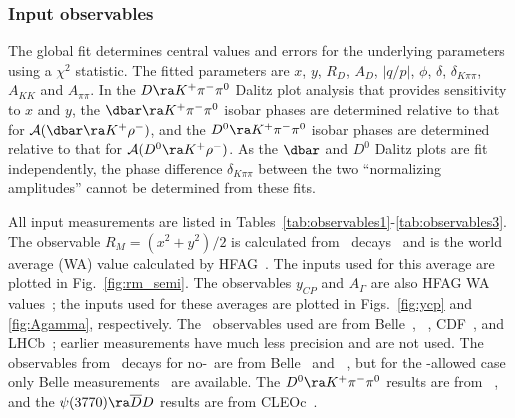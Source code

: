 \subsubsection{Input observables}

The global fit determines central values and errors for
the underlying parameters using a $\chi^2$ statistic.
The fitted parameters are $x$, $y$, $R^{}_D$, $A^{}_D$,
$|q/p|$, $\phi$, $\delta$, $\delta^{}_{K\pi\pi}$,
$A^{}_{KK}$ and $A^{}_{\pi\pi}$.
In the $D\ra K^+\pi^-\pi^0$ 
Dalitz plot analysis that provides sensitivity to $x$ and $y$, 
the $\dbar\ra K^+\pi^-\pi^0$ isobar phases are determined 
relative to that for ${\cal A}(\dbar\ra K^+\rho^-)$, and 
the $D^0\ra K^+\pi^-\pi^0$ isobar phases are determined 
relative to that for ${\cal A}(D^0\ra K^+\rho^-)$. 
As the $\dbar$ and $D^0$ Dalitz plots are fit independently, 
the phase difference $\delta^{}_{K\pi\pi}$ between the
two ``normalizing amplitudes'' cannot be determined
from these fits.

All input measurements are listed in 
Tables~\ref{tab:observables1}-\ref{tab:observables3}. 
The observable $R^{}_M=(x^2+y^2)/2$ is calculated from \dklnu\ 
decays~\cite{Aitala:1996vz,Cawlfield:2005ze,Aubert:2007aa,Bitenc:2008bk}
and is the world average (WA) value calculated by 
HFAG~\cite{HFAG_charm:webpage}. The inputs used for
this average are plotted in Fig.~\ref{fig:rm_semi}.
The observables $y^{}_{CP}$ and $A^{}_\Gamma$ are also
HFAG WA values~\cite{HFAG_charm:webpage}; the inputs
used for these averages are plotted in
Figs.~\ref{fig:ycp} and \ref{fig:Agamma}, respectively.
The \dkpi\ observables used are from 
Belle~\cite{Zhang:2006dp,Ko:2014qvu}, 
\babar~\cite{Aubert:2007wf}, 
CDF~\cite{Aaltonen:2013pja}, and
LHCb~\cite{Aaij:2013wda};
earlier measurements have much less precision and are not used.
The observables from \dkspp\ decays for no-\cpv\ are from 
Belle~\cite{Peng:2014oda} and \babar~\cite{delAmoSanchez:2010xz}, 
but for the \cpv-allowed case only Belle 
measurements~\cite{Peng:2014oda} are available. The 
$D^0\ra K^+\pi^-\pi^0$ results are from \babar~\cite{Aubert:2008zh},
and the $\psi(3770)\ra\overline{D}D$ results are from 
CLEOc~\cite{Asner:2012xb}.


